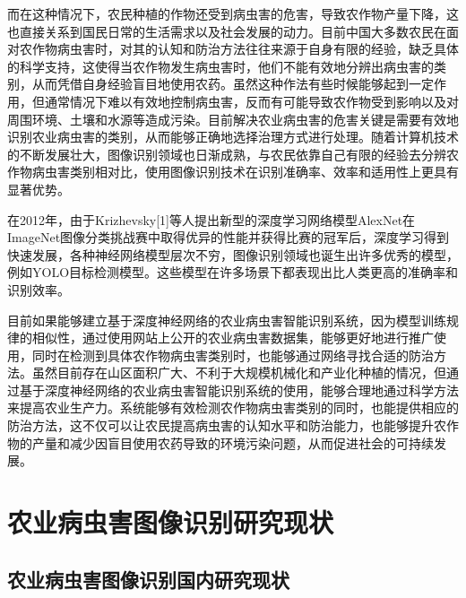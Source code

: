 \documentclass[12pt, a4paper, twoside]{ctexart}
\begin{document}
而在这种情况下，农民种植的作物还受到病虫害的危害，导致农作物产量下降，这也直接关系到国民日常的生活需求以及社会发展的动力。目前中国大多数农民在面对农作物病虫害时，对其的认知和防治方法往往来源于自身有限的经验，缺乏具体的科学支持，这使得当农作物发生病虫害时，他们不能有效地分辨出病虫害的类别，从而凭借自身经验盲目地使用农药。虽然这种作法有些时候能够起到一定作用，但通常情况下难以有效地控制病虫害，反而有可能导致农作物受到影响以及对周围环境、土壤和水源等造成污染。目前解决农业病虫害的危害关键是需要有效地识别农业病虫害的类别，从而能够正确地选择治理方式进行处理。随着计算机技术的不断发展壮大，图像识别领域也日渐成熟，与农民依靠自己有限的经验去分辨农作物病虫害类别相对比，使用图像识别技术在识别准确率、效率和适用性上更具有显著优势。

在2012年，由于Krizhevsky[1]等人提出新型的深度学习网络模型AlexNet在ImageNet图像分类挑战赛中取得优异的性能并获得比赛的冠军后，深度学习得到快速发展，各种神经网络模型层次不穷，图像识别领域也诞生出许多优秀的模型，例如YOLO目标检测模型。这些模型在许多场景下都表现出比人类更高的准确率和识别效率。

目前如果能够建立基于深度神经网络的农业病虫害智能识别系统，因为模型训练规律的相似性，通过使用网站上公开的农业病虫害数据集，能够更好地进行推广使用，同时在检测到具体农作物病虫害类别时，也能够通过网络寻找合适的防治方法。虽然目前存在山区面积广大、不利于大规模机械化和产业化种植的情况，但通过基于深度神经网络的农业病虫害智能识别系统的使用，能够合理地通过科学方法来提高农业生产力。系统能够有效检测农作物病虫害类别的同时，也能提供相应的防治方法，这不仅可以让农民提高病虫害的认知水平和防治能力，也能够提升农作物的产量和减少因盲目使用农药导致的环境污染问题，从而促进社会的可持续发展。


\section{农业病虫害图像识别研究现状}


\subsection{农业病虫害图像识别国内研究现状}
\end{document}
